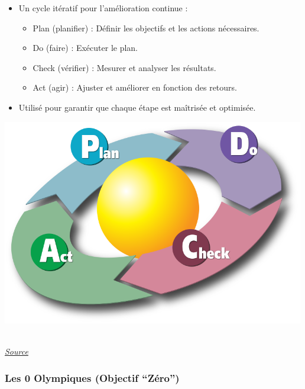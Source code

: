 \documentclass[
  letterpaper,
  DIV=11,
  numbers=noendperiod]{scrartcl}
\providecommand{\tightlist}{%
  \setlength{\itemsep}{0pt}\setlength{\parskip}{0pt}}\usepackage{longtable,booktabs,array}
\begin{document}
\begin{itemize}
\item
  Un cycle itératif pour l'amélioration continue :

  \begin{itemize}
  \tightlist
  \item
    Plan (planifier) : Définir les objectifs et les actions nécessaires.
  \item
    Do (faire) : Exécuter le plan.
  \item
    Check (vérifier) : Mesurer et analyser les résultats.
  \item
    Act (agir) : Ajuster et améliorer en fonction des retours.
  \end{itemize}
\item
  Utilisé pour garantir que chaque étape est maîtrisée et optimisée.
\end{itemize}

\begin{center}
\includegraphics[width=5.20833in,height=\textheight,keepaspectratio]{images/PCDA.png}
\end{center}
\\
\href{https://web.archive.org/web/20210624065640/https://learn.saylor.org/mod/page/view.php?id=21134}{\emph{Source}}

\subsubsection{Les 0 Olympiques (Objectif
``Zéro'')}\label{les-0-olympiques-objectif-zuxe9ro}
\end{document}
